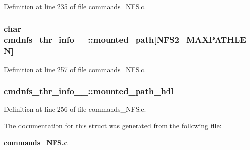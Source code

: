Definition at line 235 of file commands\_\-NFS.c.
\subsubsection[{mounted\_\-path}]{\setlength{\rightskip}{0pt plus 5cm}char {\bf cmdnfs\_\-thr\_\-info\_\-\_\-::mounted\_\-path}[NFS2\_\-MAXPATHLEN]}\label{structcmdnfs__thr__info_____aafeeffda7da14477bd029846cf854a70}


Definition at line 257 of file commands\_\-NFS.c.
\subsubsection[{mounted\_\-path\_\-hdl}]{ {\bf cmdnfs\_\-thr\_\-info\_\-\_\-::mounted\_\-path\_\-hdl}}\label{structcmdnfs__thr__info_____af5b218cad30ccd192ef64258f8a529cc}


Definition at line 256 of file commands\_\-NFS.c.

The documentation for this struct was generated from the following file:\begin{DoxyCompactItemize}
\item 
{\bf commands\_\-NFS.c}\end{DoxyCompactItemize}
